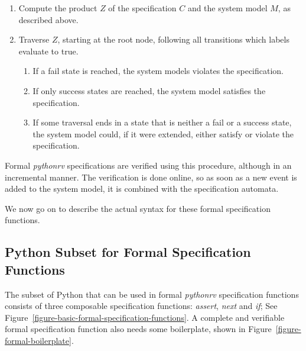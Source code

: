 \documentclass[a4paper,11pt]{kth-mag}
\begin{document}
\begin{enumerate}
  \item Compute the product $Z$ of the specification $C$ and the system model
    $M$, as described above.

  \item Traverse $Z$, starting at the root node, following all transitions
    which labels evaluate to true.

    \begin{enumerate}
      \item If a fail state is reached, the system models violates the
        specification.
      \item If only success states are reached, the system model satisfies the
        specification.
      \item If some traversal ends in a state that is neither a fail or a
        success state, the system model could, if it were extended, either
        satisfy or violate the specification.
    \end{enumerate}
\end{enumerate}

Formal \textit{pythonrv} specifications are verified using this procedure,
although in an incremental manner. The verification is done online, so as soon
as a new event is added to the system model, it is combined with the
specification automata.

We now go on to describe the actual syntax for these formal specification
functions.


\subsection{Python Subset for Formal Specification Functions}
\label{section-approach-python-subset}
\lstset{language=Python,numbers=left}

The subset of Python that can be used in formal \textit{pythonrv} specification
functions consists of three composable specification functions:
\textit{assert}, \textit{next} and \textit{if}; See
Figure~\ref{figure-basic-formal-specification-functions}. A complete and
verifiable formal specification function also needs some boilerplate, shown in
Figure~\ref{figure-formal-boilerplate}.
\end{document}
